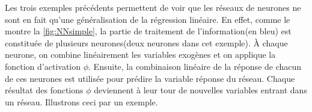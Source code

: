 \begin{figure}[h]
\end{figure}


Les trois exemples précédents permettent de voir que les réseaux de neurones ne sont en fait qu'une généralisation de la régression linéaire. En effet, comme le montre la \autoref{fig:NNsimple}, la partie de traitement de l'information(en bleu) est constituée de plusieurs neurones(deux neurones dans cet exemple). À chaque neurone, on combine linéairement les variables exogènes et on applique la fonction d'activation $\phi$. Ensuite, la combinaison linéaire de la réponse de chacun de ces neurones est utilisée pour prédire la variable réponse du réseau. Chaque résultat des fonctions $\phi$ deviennent à leur tour de nouvelles variables entrant dans un réseau. Illustrons ceci par un exemple.

